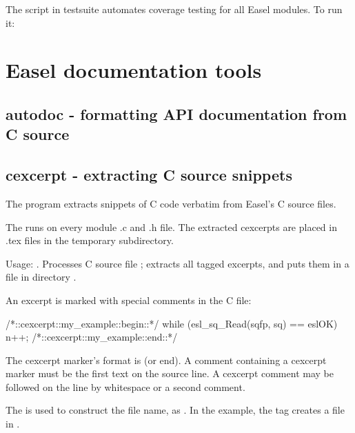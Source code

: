 The  script in testsuite automates coverage
testing for all Easel modules. To run it:

\begin{cchunk} 
\end{cchunk}


\section{Easel documentation tools}

\subsection{autodoc - formatting API documentation from C source}


\subsection{cexcerpt - extracting C source snippets}

The  program extracts snippets of C code verbatim from
Easel's C source files.

The  runs  on every
module .c and .h file. The extracted cexcerpts are placed in .tex
files in the temporary  subdirectory.

Usage: . Processes C source file
; extracts all tagged excerpts, and puts them in a file
in directory .

An excerpt is marked with special comments in the C file:
\begin{cchunk}
/*::cexcerpt::my_example::begin::*/
   while (esl_sq_Read(sqfp, sq) == eslOK)
     { n++; }
/*::cexcerpt::my_example::end::*/
\end{cchunk}

The cexcerpt marker's format is  (or
end). A comment containing a cexcerpt marker must be the first text on
the source line. A cexcerpt comment may be followed on the line by
whitespace or a second comment.

The  is used to construct the file name, as
.  In the example, the tag  creates
a file  in .

